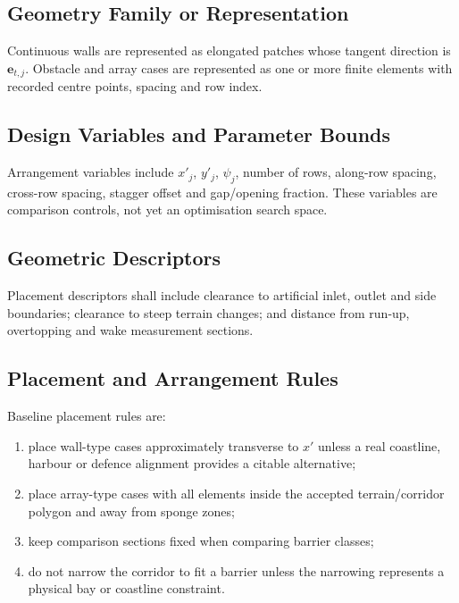 \subsection{Geometry Family or Representation}
\label{sec:res-geo-arr-geometry-family-representation}

Continuous walls are represented as elongated patches whose tangent
direction is $\mathbf{e}_{t,j}$. Obstacle and array cases are
represented as one or more finite elements with recorded centre
points, spacing and row index.

\subsection{Design Variables and Parameter Bounds}
\label{sec:res-geo-arr-design-variables-parameter-bounds}

Arrangement variables include $x'_j$, $y'_j$, $\psi_j$, number of rows,
along-row spacing, cross-row spacing, stagger offset and gap/opening
fraction. These variables are comparison controls, not yet an
optimisation search space.

\subsection{Geometric Descriptors}
\label{sec:res-geo-arr-geometric-descriptors}

Placement descriptors shall include clearance to artificial inlet,
outlet and side boundaries; clearance to steep terrain changes; and
distance from run-up, overtopping and wake measurement sections.

\subsection{Placement and Arrangement Rules}
\label{sec:res-geo-arr-placement-arrangement-rules}

Baseline placement rules are:

\begin{enumerate}
  \item place wall-type cases approximately transverse to $x'$ unless
    a real coastline, harbour or defence alignment provides a citable
    alternative;
  \item place array-type cases with all elements inside the accepted
    terrain/corridor polygon and away from sponge zones;
  \item keep comparison sections fixed when comparing barrier classes;
  \item do not narrow the corridor to fit a barrier unless the
    narrowing represents a physical bay or coastline constraint.
\end{enumerate}

